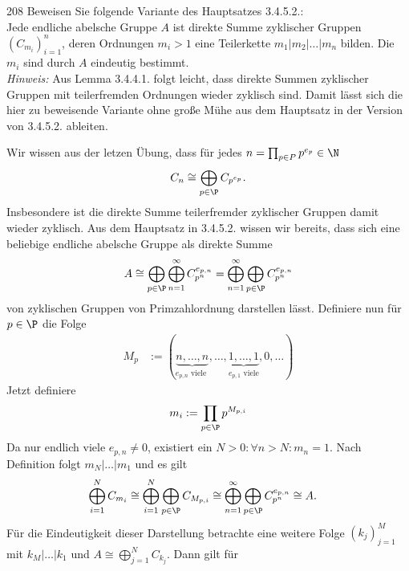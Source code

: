 \begin{algebraUE}{208}
Beweisen Sie folgende Variante des Hauptsatzes 3.4.5.2.: \\
Jede endliche abelsche Gruppe $A$ ist direkte Summe zyklischer Gruppen $(C_{m_i})_{i=1}^n$,
deren Ordnungen $m_i > 1$ eine Teilerkette $m_1 | m_2 | \dots | m_n$ bilden.
Die $m_i$ sind durch $A$ eindeutig bestimmt. \\
\textit{Hinweis:} Aus Lemma 3.4.4.1. folgt leicht, dass direkte Summen zyklischer
Gruppen mit teilerfremden Ordnungen wieder zyklisch sind. Damit lässt sich die
hier zu beweisende Variante ohne große Mühe aus dem Hauptsatz in der Version
von 3.4.5.2. ableiten.
\end{algebraUE}
\begin{solution}
Wir wissen aus der letzen Übung, dass für jedes $n = \prod_{p \in P}p^{e_p}\in \N$
\begin{align*}
  C_n \cong \bigoplus_{p \in \P}C_{p^{e_p}}.
\end{align*}
Insbesondere ist die direkte Summe teilerfremder zyklischer Gruppen damit wieder zyklisch.
Aus dem Hauptsatz in 3.4.5.2. wissen wir bereits, dass sich eine beliebige endliche
abelsche Gruppe als direkte Summe
\begin{align*}
  A \cong \bigoplus_{p \in \P}\bigoplus_{n=1}^{\infty}C_{p^n}^{e_{p,n}}
  =  \bigoplus_{n=1}^{\infty}\bigoplus_{p \in \P}C_{p^n}^{e_{p,n}}
\end{align*}
von zyklischen Gruppen von Primzahlordnung darstellen lässt.
Definiere nun für $p \in \P$ die Folge
\begin{align*}
  M_p &:= (\underbrace{n,\dots,n}_{e_{p,n} \text{ viele }},\dots,
  \underbrace{1,\dots,1}_{e_{p,1} \text{ viele}},0,\dots)
\end{align*}
Jetzt definiere
\begin{align*}
  m_i := \prod_{p \in \P}p^{M_{p,i}}
\end{align*}
Da nur endlich viele $e_{p,n} \neq 0$, existiert ein $N > 0: \forall n > N: m_n = 1$.
Nach Definition folgt $m_N | \dots | m_1$ und es gilt
\begin{align*}
  \bigoplus_{i = 1}^{N} C_{m_i} &\cong \bigoplus_{i = 1}^{N}\bigoplus_{p \in \P}C_{M_{p,i}}
  \cong \bigoplus_{n=1}^{\infty}\bigoplus_{p \in \P}C_{p^n}^{e_{p,n}} \cong A.
\end{align*}
Für die Eindeutigkeit dieser Darstellung betrachte eine weitere Folge $(k_j)_{j=1}^M$
mit $k_M | \dots | k_1$ und $A \cong \bigoplus_{j = 1}^{N} C_{k_j}$.
Dann gilt für
\begin{align*}

\end{align*}
\end{solution}
